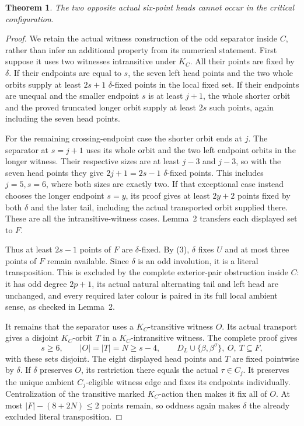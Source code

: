 \documentclass[11pt,a4paper]{article}
\newtheorem{theorem}[lemma]{Theorem}
\begin{document}
\begin{theorem}
The two opposite actual six-point heads cannot occur in
the critical configuration.
\end{theorem}
\begin{proof}
We retain the actual witness construction of the odd separator
inside $C$, rather than infer an additional property from its
numerical statement. First suppose it uses two witnesses
intransitive under $K_C$.
All their points are fixed by $\delta$. If their endpoints
are equal to $s$, the seven left head points and the two
whole orbits supply at least $2s+1$ $\delta$-fixed points
in the local fixed set. If their endpoints are unequal and
the smaller endpoint $s$ is at least $j+1$, the whole shorter
orbit and the proved truncated longer orbit supply at least
$2s$ such points, again including the seven head points.

For the remaining crossing-endpoint case the shorter orbit
ends at $j$. The separator at $s=j+1$ uses its whole orbit
and the two left endpoint orbits in the longer witness.
Their respective sizes are at least $j-3$ and $j-3$,
so with the seven head points they give
$2j+1=2s-1$ $\delta$-fixed points.
This includes $j=5,s=6$, where both sizes are exactly two.
If that exceptional case instead chooses the longer endpoint
$s=y$, its proof gives at least $2y+2$ points fixed by both
$\delta$ and the later tail, including the actual transported
orbit supplied there. These are all the intransitive-witness
cases. Lemma~2 transfers each displayed set to $F$.

Thus at least $2s-1$ points of $F$ are $\delta$-fixed.
By (3), $\delta$ fixes $U$ and at most three points of $F$
remain available. Since $\delta$ is an odd involution,
it is a literal transposition. This is excluded by the
complete exterior-pair obstruction inside $C$: it has odd
degree $2p+1$, its actual natural alternating tail and left
head are unchanged, and every required later colour is paired
in its full local ambient sense, as checked in Lemma~2.

It remains that the separator uses a $K_C$-transitive witness
$O$. Its actual transport gives a disjoint $K_C$-orbit $T$
in a $K_C$-intransitive witness. The complete proof gives
\[
 s\ge6,\qquad |O|=|T|=N\ge s-4,
 \qquad D_L\cup\{\beta,\beta^\sigma\},\ O,\ T\subseteq F,
\]
with these sets disjoint. The eight displayed head points
and $T$ are fixed pointwise by $\delta$.
If $\delta$ preserves $O$, its restriction there equals
the actual $\tau\in C_j$. It preserves the unique ambient
$C_j$-eligible witness edge and fixes its endpoints individually.
Centralization of the transitive marked $K_C$-action then
makes it fix all of $O$. At most
$|F|-(8+2N)\le2$ points remain, so oddness again makes
$\delta$ the already excluded literal transposition.


\end{proof}
\end{document}
